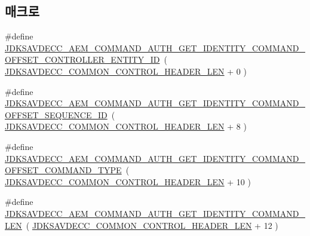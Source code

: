 \subsection*{매크로}
\begin{DoxyCompactItemize}
\item 
\#define \hyperlink{group__command__auth__get__identity_ga3c627506a8d7eb025bc44cf283300127}{J\+D\+K\+S\+A\+V\+D\+E\+C\+C\+\_\+\+A\+E\+M\+\_\+\+C\+O\+M\+M\+A\+N\+D\+\_\+\+A\+U\+T\+H\+\_\+\+G\+E\+T\+\_\+\+I\+D\+E\+N\+T\+I\+T\+Y\+\_\+\+C\+O\+M\+M\+A\+N\+D\+\_\+\+O\+F\+F\+S\+E\+T\+\_\+\+C\+O\+N\+T\+R\+O\+L\+L\+E\+R\+\_\+\+E\+N\+T\+I\+T\+Y\+\_\+\+ID}~( \hyperlink{group__jdksavdecc__avtp__common__control__header_gaae84052886fb1bb42f3bc5f85b741dff}{J\+D\+K\+S\+A\+V\+D\+E\+C\+C\+\_\+\+C\+O\+M\+M\+O\+N\+\_\+\+C\+O\+N\+T\+R\+O\+L\+\_\+\+H\+E\+A\+D\+E\+R\+\_\+\+L\+EN} + 0 )
\item 
\#define \hyperlink{group__command__auth__get__identity_gaadde34827077806c428cf6ead34ceae6}{J\+D\+K\+S\+A\+V\+D\+E\+C\+C\+\_\+\+A\+E\+M\+\_\+\+C\+O\+M\+M\+A\+N\+D\+\_\+\+A\+U\+T\+H\+\_\+\+G\+E\+T\+\_\+\+I\+D\+E\+N\+T\+I\+T\+Y\+\_\+\+C\+O\+M\+M\+A\+N\+D\+\_\+\+O\+F\+F\+S\+E\+T\+\_\+\+S\+E\+Q\+U\+E\+N\+C\+E\+\_\+\+ID}~( \hyperlink{group__jdksavdecc__avtp__common__control__header_gaae84052886fb1bb42f3bc5f85b741dff}{J\+D\+K\+S\+A\+V\+D\+E\+C\+C\+\_\+\+C\+O\+M\+M\+O\+N\+\_\+\+C\+O\+N\+T\+R\+O\+L\+\_\+\+H\+E\+A\+D\+E\+R\+\_\+\+L\+EN} + 8 )
\item 
\#define \hyperlink{group__command__auth__get__identity_ga5747aa59c2559e39ece75422689e1859}{J\+D\+K\+S\+A\+V\+D\+E\+C\+C\+\_\+\+A\+E\+M\+\_\+\+C\+O\+M\+M\+A\+N\+D\+\_\+\+A\+U\+T\+H\+\_\+\+G\+E\+T\+\_\+\+I\+D\+E\+N\+T\+I\+T\+Y\+\_\+\+C\+O\+M\+M\+A\+N\+D\+\_\+\+O\+F\+F\+S\+E\+T\+\_\+\+C\+O\+M\+M\+A\+N\+D\+\_\+\+T\+Y\+PE}~( \hyperlink{group__jdksavdecc__avtp__common__control__header_gaae84052886fb1bb42f3bc5f85b741dff}{J\+D\+K\+S\+A\+V\+D\+E\+C\+C\+\_\+\+C\+O\+M\+M\+O\+N\+\_\+\+C\+O\+N\+T\+R\+O\+L\+\_\+\+H\+E\+A\+D\+E\+R\+\_\+\+L\+EN} + 10 )
\item 
\#define \hyperlink{group__command__auth__get__identity_ga6a7075537cb3a9cc61c022594fc5e815}{J\+D\+K\+S\+A\+V\+D\+E\+C\+C\+\_\+\+A\+E\+M\+\_\+\+C\+O\+M\+M\+A\+N\+D\+\_\+\+A\+U\+T\+H\+\_\+\+G\+E\+T\+\_\+\+I\+D\+E\+N\+T\+I\+T\+Y\+\_\+\+C\+O\+M\+M\+A\+N\+D\+\_\+\+L\+EN}~( \hyperlink{group__jdksavdecc__avtp__common__control__header_gaae84052886fb1bb42f3bc5f85b741dff}{J\+D\+K\+S\+A\+V\+D\+E\+C\+C\+\_\+\+C\+O\+M\+M\+O\+N\+\_\+\+C\+O\+N\+T\+R\+O\+L\+\_\+\+H\+E\+A\+D\+E\+R\+\_\+\+L\+EN} + 12 )
\end{DoxyCompactItemize}
